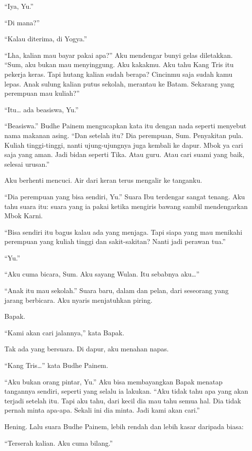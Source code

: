 \documentclass[11pt,twoside,openany]{book}
\begin{document}
``Iya, Yu.''

``Di mana?''

``Kalau diterima, di Yogya.''

``Lha, kalian mau bayar pakai apa?'' Aku mendengar bunyi gelas diletakkan. ``Sum, aku bukan mau menyinggung. Aku kakakmu. Aku tahu Kang Tris itu pekerja keras. Tapi hutang kalian sudah berapa? Cincinmu saja sudah kamu lepas. Anak sulung kalian putus sekolah, merantau ke Batam. Sekarang yang perempuan mau kuliah?''

``Itu\ldots{} ada beasiswa, Yu.''

``Beasiswa.'' Budhe Painem mengucapkan kata itu dengan nada seperti menyebut nama makanan asing. ``Dan setelah itu? Dia perempuan, Sum. Penyakitan pula. Kuliah tinggi-tinggi, nanti ujung-ujungnya juga kembali ke dapur. Mbok ya cari saja yang aman. Jadi bidan seperti Tika. Atau guru. Atau cari suami yang baik, selesai urusan.''

Aku berhenti mencuci. Air dari keran terus mengalir ke tanganku.

``Dia perempuan yang bisa sendiri, Yu.'' Suara Ibu terdengar sangat tenang. Aku tahu suara itu: suara yang ia pakai ketika mengiris bawang sambil mendengarkan Mbok Karni.

``Bisa sendiri itu bagus kalau ada yang menjaga. Tapi siapa yang mau menikahi perempuan yang kuliah tinggi dan sakit-sakitan? Nanti jadi perawan tua.''

``Yu.''

``Aku cuma bicara, Sum. Aku sayang Wulan. Itu sebabnya aku\ldots{}''

``Anak itu mau sekolah.'' Suara baru, dalam dan pelan, dari seseorang yang jarang berbicara. Aku nyaris menjatuhkan piring.

Bapak.

``Kami akan cari jalannya,'' kata Bapak.

Tak ada yang bersuara. Di dapur, aku menahan napas.

``Kang Tris\ldots{}'' kata Budhe Painem.

``Aku bukan orang pintar, Yu.'' Aku bisa membayangkan Bapak menatap tangannya sendiri, seperti yang selalu ia lakukan. ``Aku tidak tahu apa yang akan terjadi setelah itu. Tapi aku tahu, dari kecil dia mau tahu semua hal. Dia tidak pernah minta apa-apa. Sekali ini dia minta. Jadi kami akan cari.''

Hening. Lalu suara Budhe Painem, lebih rendah dan lebih kasar daripada biasa:

``Terserah kalian. Aku cuma bilang.''
\end{document}
